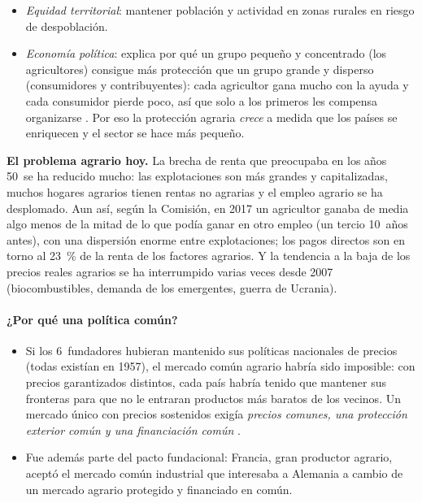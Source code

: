 \documentclass[11pt]{article}
\begin{document}
\begin{itemize}
\begin{itemize}
  \end{itemize}
\item \emph{Equidad territorial}: mantener población y actividad en zonas rurales en riesgo de despoblación.
\item \emph{Economía política}: \textcite{Olson1965Logic} explica por qué un grupo pequeño y concentrado (los agricultores) consigue más protección que un grupo grande y disperso (consumidores y contribuyentes): cada agricultor gana mucho con la ayuda y cada consumidor pierde poco, así que solo a los primeros les compensa organizarse . Por eso la protección agraria \emph{crece} a medida que los países se enriquecen y el sector se hace más pequeño\nocite{AndersonRausserSwinnen2013}.
\end{itemize}

\begin{anotaciones}
\textbf{El problema agrario hoy.} La brecha de renta que preocupaba en los años 50~se ha reducido mucho: las explotaciones son más grandes y capitalizadas, muchos hogares agrarios tienen rentas no agrarias y el empleo agrario se ha desplomado. Aun así, según la Comisión, en 2017 un agricultor ganaba de media algo menos de la mitad de lo que podía ganar en otro empleo (un tercio 10~años antes), con una dispersión enorme entre explotaciones; los pagos directos son en torno al 23~\% de la renta de los factores agrarios\nocite{CE2026ObjetivosPAC,CE2026GastoPAC}. Y la tendencia a la baja de los precios reales agrarios se ha interrumpido varias veces desde 2007 (biocombustibles, demanda de los emergentes, guerra de Ucrania).
\end{anotaciones}

\paragraph{¿Por qué una política común?}

\begin{itemize}
\item Si los 6~fundadores hubieran mantenido sus políticas nacionales de precios (todas existían en 1957), el mercado común agrario habría sido imposible: con precios garantizados distintos, cada país habría tenido que mantener sus fronteras para que no le entraran productos más baratos de los vecinos. Un mercado único con precios sostenidos exigía \emph{precios comunes, una protección exterior común y una financiación común} .
\item Fue además parte del pacto fundacional: Francia, gran productor agrario, aceptó el mercado común industrial que interesaba a Alemania a cambio de un mercado agrario protegido y financiado en común.
\end{itemize}
\end{document}
